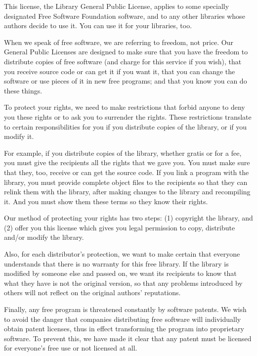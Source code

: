 This license, the Library General Public License, applies to some specially designated Free Software Foundation software, and to any other libraries whose authors decide to use it. You can use it for your libraries, too. 

When we speak of free software, we are referring to freedom, not price. Our General Public Licenses are designed to make sure that you have the freedom to distribute copies of free software (and charge for this service if you wish), that you receive source code or can get it if you want it, that you can change the software or use pieces of it in new free programs; and that you know you can do these things. 

To protect your rights, we need to make restrictions that forbid anyone to deny you these rights or to ask you to surrender the rights. These restrictions translate to certain responsibilities for you if you distribute copies of the library, or if you modify it. 

For example, if you distribute copies of the library, whether gratis or for a fee, you must give the recipients all the rights that we gave you. You must make sure that they, too, receive or can get the source code. If you link a program with the library, you must provide complete object files to the recipients so that they can relink them with the library, after making changes to the library and recompiling it. And you must show them these terms so they know their rights. 

Our method of protecting your rights has two steps: (1) copyright the library, and (2) offer you this license which gives you legal permission to copy, distribute and/or modify the library. 

Also, for each distributor's protection, we want to make certain that everyone understands that there is no warranty for this free library. If the library is modified by someone else and passed on, we want its recipients to know that what they have is not the original version, so that any problems introduced by others will not reflect on the original authors' reputations. 

Finally, any free program is threatened constantly by software patents. We wish to avoid the danger that companies distributing free software will individually obtain patent licenses, thus in effect transforming the program into proprietary software. To prevent this, we have made it clear that any patent must be licensed for everyone's free use or not licensed at all. 

